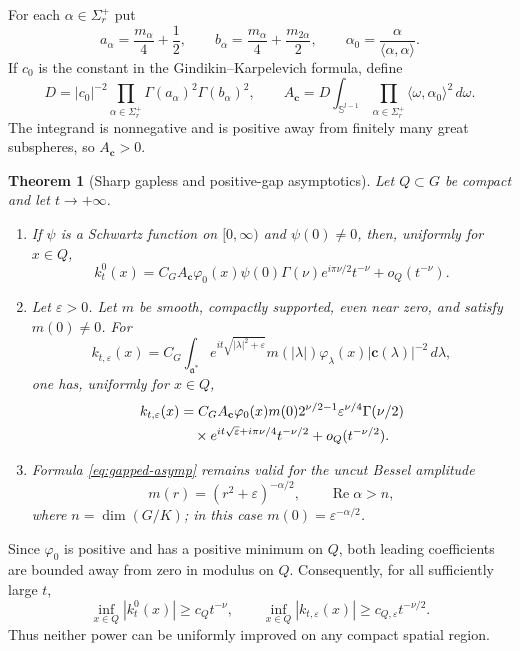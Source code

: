 \documentclass[11pt]{article}
\newtheorem{theorem}{Theorem}
\newcommand{\Sphere}{\mathbb S}
\newcommand{\cHC}{\mathbf c}
\newcommand{\dd}{\,d}
\begin{document}
For each $\alpha\in\Sigma_r^+$ put
\[
 a_\alpha=\frac{m_\alpha}{4}+\frac12,
 \qquad b_\alpha=\frac{m_\alpha}{4}+\frac{m_{2\alpha}}2,
 \qquad \alpha_0=\frac{\alpha}{\langle\alpha,\alpha\rangle}.
\]
If $c_0$ is the constant in the Gindikin--Karpelevich formula, define
\begin{equation}\label{eq:Ac}
 D=|c_0|^{-2}\prod_{\alpha\in\Sigma_r^+}
       \Gamma(a_\alpha)^2\Gamma(b_\alpha)^2,
 \qquad
 A_{\cHC}=D\int_{\Sphere^{l-1}}
       \prod_{\alpha\in\Sigma_r^+}
       \langle\omega,\alpha_0\rangle^2\dd\omega .
\end{equation}
The integrand is nonnegative and is positive away from finitely many great
subspheres, so $A_{\cHC}>0$.

\begin{theorem}[Sharp gapless and positive-gap asymptotics]\label{thm:main}
Let $Q\subset G$ be compact and let $t\to+\infty$.
\begin{enumerate}
\item If $\psi$ is a Schwartz function on $[0,\infty)$ and
$\psi(0)\ne0$, then, uniformly for $x\in Q$,
\begin{equation}\label{eq:gapless-asymp}
 k_t^0(x)=C_GA_{\cHC}\varphi_0(x)\psi(0)\Gamma(\nu)
 e^{i\pi\nu/2}t^{-\nu}+o_Q(t^{-\nu}).
\end{equation}
\item Let $\varepsilon>0$.  Let $m$ be smooth, compactly supported, even
near zero, and satisfy $m(0)\ne0$.  For
\begin{equation}\label{eq:gapped-kernel}
 k_{t,\varepsilon}(x)=C_G\int_{\mathfrak a^*}
 e^{it\sqrt{|\lambda|^2+\varepsilon}}m(|\lambda|)
 \varphi_\lambda(x)|\cHC(\lambda)|^{-2}\dd\lambda,
\end{equation}
one has, uniformly for $x\in Q$,
\begin{align}\label{eq:gapped-asymp}
 k_{t,\varepsilon}(x)
 &=C_GA_{\cHC}\varphi_0(x)m(0)
 2^{\nu/2-1}\varepsilon^{\nu/4}\Gamma(\nu/2)\notag\\
 &\quad\times e^{it\sqrt\varepsilon+i\pi\nu/4}t^{-\nu/2}
 +o_Q(t^{-\nu/2}).
\end{align}
\item Formula \eqref{eq:gapped-asymp} remains valid for the uncut Bessel
amplitude
\[
       m(r)=(r^2+\varepsilon)^{-\alpha/2},\qquad \operatorname{Re}\alpha>n,
\]
where $n=\dim(G/K)$; in this case $m(0)=\varepsilon^{-\alpha/2}$.
\end{enumerate}
\end{theorem}

Since $\varphi_0$ is positive and has a positive minimum on $Q$, both
leading coefficients are bounded away from zero in modulus on $Q$.
Consequently, for all sufficiently large $t$,
\[
 \inf_{x\in Q}|k_t^0(x)|\ge c_Qt^{-\nu},\qquad
 \inf_{x\in Q}|k_{t,\varepsilon}(x)|\ge c_{Q,\varepsilon}t^{-\nu/2}.
\]
Thus neither power can be uniformly improved on any compact spatial region.
\end{document}
